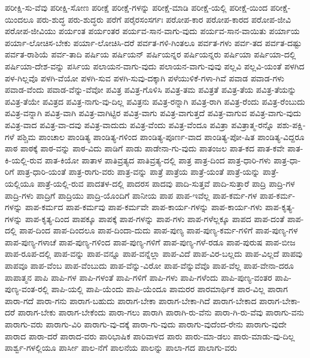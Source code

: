 {ಪರೀಕ್ಷಿ-ಸು-ವೆವು
ಪರೀಕ್ಷಿ-ಸೋಣ
ಪರೀಕ್ಷೆ
ಪರೀಕ್ಷೆ-ಗಳನ್ನು
ಪರೀಕ್ಷೆ-ಮಾಡಿ
ಪರೀಕ್ಷೆ-ಯಲ್ಲಿ
ಪರೀಕ್ಷೆ-ಯಿಂದ
ಪರೀಕ್ಷೆ-ಯಿಂದಲೂ
ಪರು-ಶುದ್ಧ
ಪರು-ಶುದ್ಧರು
ಪರೆಗೆ
ಪರೈರಸಂಸರ್ಗಃ
ಪರೋಪ-ಕಾರ
ಪರೋಪ-ಕಾರದ
ಪರೋಪ-ಜೀವಿ
ಪರೋಪ-ಜೀವಿಯು
ಪರ್ಯಂತ
ಪರ್ಯಂತರ
ಪರ್ಯವ-ಸಾನ-ವಾಗು-ವುದು
ಪರ್ಯವ-ಸಾನ-ವಾಯಿತು
ಪರ್ಯಾಯ
ಪರ್ಯಾ-ಲೋಚಿಸ-ಬೇಕು
ಪರ್ಯಾ-ಲೋಚಿಸಿ-ದರೆ
ಪರ್ವತ-ಗಳಿ-ಗಿಂತಲೂ
ಪರ್ವತ-ಗಳು
ಪರ್ವ-ತದ
ಪರ್ವತ-ದಷ್ಟು
ಪರ್ವತ-ರಾಶಿಯೆ
ಪರ್ವ-ತಾದಿ
ಪರ್ಷಿಯ
ಪರ್ಷಿಯನ್
ಪರ್ಷಿಯನ್ನರ
ಪರ್ಷಿಯನ್ನರು
ಪರ್ಷಿಯಾ
ಪರ್ಷಿಯಾ-ದಲ್ಲಿ
ಪರ್ಷಿಯಾ-ದೇಶ-ವನ್ನು
ಪರ್ಸಿಯ
ಪಲಾಯನ-ವಾಗು-ವುದು
ಪಲಾಯನ-ವಾಗು-ವುವು
ಪಲ್ಲವಿ
ಪಲ್ಲವಿ-ಯಂತೆ
ಪಳಗಿದ
ಪಳ-ಗಿಲ್ಲವೊ
ಪಳಗಿ-ವೆಯೋ
ಪಳಗಿ-ಸುವ
ಪಳಗಿ-ಸುವು-ದಕ್ಕಾಗಿ
ಪಳೆಯುಳಿಕೆ-ಗಳಾ-ಗಿವೆ
ಪವಾಡ
ಪವಾಡ-ಗಳು
ಪವಾಡ-ವೆಂದು
ಪವಾಡ-ವೆನ್ನು-ವೆವೋ
ಪವಿತ್ರ
ಪವಿತ್ರ-ಗೊಳಿಸಿ
ಪವಿತ್ರ-ತಮ
ಪವಿತ್ರತೆ
ಪವಿತ್ರ-ತೆಯ
ಪವಿತ್ರ-ತೆಯನ್ನು
ಪವಿತ್ರ-ತೆಯೇ
ಪವಿತ್ರದ
ಪವಿತ್ರ-ನಾಗು-ವು-ದಿಲ್ಲ
ಪವಿತ್ರನು
ಪವಿತ್ರ-ರನ್ನಾಗಿ
ಪವಿತ್ರ-ರಾಗಿ
ಪವಿತ್ರ-ರೆಂದು
ಪವಿತ್ರ-ರೆಂಬುದು
ಪವಿತ್ರ-ವನ್ನಾಗಿ
ಪವಿತ್ರ-ವಾಗಿ
ಪವಿತ್ರ-ವಾಗಿಟ್ಟಿರ
ಪವಿತ್ರ-ವಾಗು
ಪವಿತ್ರ-ವಾಗುತ್ತದೆ
ಪವಿತ್ರ-ವಾಗುವ
ಪವಿತ್ರ-ವಾಗು-ವುದು
ಪವಿತ್ರ-ವಾದ
ಪವಿತ್ರ-ವಾ-ದವು
ಪವಿತ್ರ-ವಾದುದು
ಪವಿತ್ರ-ವೆಂದು
ಪವಿತ್ರ-ವೆಂದೂ
ಪವಿತ್ರಾ
ಪವಿತ್ರಾತ್ಮ-ರನ್ನೊ
ಪಶು-ಪಕ್ಷಿ-ಗಳೆ
ಪಶ್ಚಿಮ
ಪಾಂಚಾಲ
ಪಾಂಡಿತ್ಯ
ಪಾಂಡಿತ್ಯ-ಗಳಿಂದ
ಪಾಂಡಿತ್ಯ-ಪೂರ್ಣ-ವಾದ
ಪಾಂಡಿತ್ಯ-ಪೋ-ಷಿತ
ಪಾಂಡಿತ್ಯ-ವಿದ್ದರೂ
ಪಾಠ
ಪಾಠಕ್ಕೆ
ಪಾಠ-ವನ್ನು
ಪಾಠ-ವಿದು
ಪಾಡಿಗೆ
ಪಾಡು
ಪಾಡೇನಾ-ಗು-ವುದು
ಪಾತಂಜಲ
ಪಾತ-ಕದ
ಪಾತ-ಕವೇ
ಪಾತ-ಕಿ-ಯಲ್ಲಿ-ರುವ
ಪಾತ-ಕಿಯೋ
ಪಾತಾಳ
ಪಾತಿವ್ರತ್ಯದ
ಪಾತಿವ್ರತ್ಯ-ದಲ್ಲಿ
ಪಾತ್ರ
ಪಾತ್ರ-ದಿಂದ
ಪಾತ್ರ-ಧಾರಿ-ಗಳು
ಪಾತ್ರ-ಧಾ-ರಿಗೆ
ಪಾತ್ರ-ಧಾರಿ-ಯಂತೆ
ಪಾತ್ರ-ರಾಗು-ವರು
ಪಾತ್ರ-ವನ್ನು
ಪಾತ್ರೆ
ಪಾತ್ರೆಯ
ಪಾತ್ರೆ-ಯಂತೆ
ಪಾತ್ರೆ-ಯನ್ನು
ಪಾತ್ರೆ-ಯಲ್ಲಿಯೂ
ಪಾತ್ರೆ-ಯಲ್ಲಿ-ರುವ
ಪಾದತಳ-ದಲ್ಲಿ
ಪಾದರಸ
ಪಾದವು
ಪಾದಿ-ಸುತ್ತವೆ
ಪಾದಿ-ಸುತ್ತಾರೆ
ಪಾದ್ರಿ
ಪಾದ್ರಿ-ಗಳ
ಪಾದ್ರಿ-ಗಳು
ಪಾದ್ರಿಗೆ
ಪಾದ್ರಿಯು
ಪಾದ್ರಿ-ಯೊಂದಿಗೆ
ಪಾನೀಯ
ಪಾಪ
ಪಾಪ-ಇವೆಲ್ಲ
ಪಾಪ-ಕರ್ಮ-ಗಳ
ಪಾಪ-ಕರ್ಮ-ಗಳನ್ನು
ಪಾಪ-ಕರ್ಮದ
ಪಾಪ-ಕರ್ಮವು
ಪಾಪ-ಕರ್ಮವೇ
ಪಾಪ-ಕಾರ್ಯ-ಗಳನ್ನು
ಪಾಪ-ಕಾರ್ಯ-ಗಳು
ಪಾಪ-ಕೃತ್ಯ-ಗಳನ್ನು
ಪಾಪ-ಕೃತ್ಯ-ದಿಂದ
ಪಾಪಕ್ಕೂ
ಪಾಪಕ್ಕೆ
ಪಾಪ-ಗಳನ್ನು
ಪಾಪ-ಗಳು
ಪಾಪ-ಗಳೆಲ್ಲಕ್ಕೂ
ಪಾಪದ
ಪಾಪ-ದಂತೆ
ಪಾಪ-ದಲ್ಲಿ
ಪಾಪ-ದಿಂದ
ಪಾಪ-ದಿಂದಲೂ
ಪಾಪ-ದಿಂದಾ-ದುದು
ಪಾಪ-ಪುಣ್ಯ
ಪಾಪ-ಪುಣ್ಯ-ಕರ್ಮ-ಗಳಿಗೆ
ಪಾಪ-ಪುಣ್ಯ-ಗಳ
ಪಾಪ-ಪುಣ್ಯ-ಗಳಾಚೆ
ಪಾಪ-ಪುಣ್ಯ-ಗಳಿಂದ
ಪಾಪ-ಪುಣ್ಯ-ಗಳಿಗೆ
ಪಾಪ-ಪುಣ್ಯ-ಗಳೆ-ರಡೂ
ಪಾಪ-ಪುರುಷ
ಪಾಪ-ಬೀಜ
ಪಾಪ-ರೂಪ-ದಲ್ಲಿ
ಪಾಪ-ವನ್ನು
ಪಾಪ-ವನ್ನೂ
ಪಾಪ-ವನ್ನೆಲ್ಲಾ
ಪಾಪ-ವಿದೆ
ಪಾಪ-ವಿರ-ಬಲ್ಲದು
ಪಾಪ-ವಿಲ್ಲದೆ
ಪಾಪವು
ಪಾಪವೂ
ಪಾಪ-ವೆಂಬ
ಪಾಪ-ವೆಂಬುದು
ಪಾಪ-ವೆನ್ನು-ವಿರೋ
ಪಾಪ-ವೆನ್ನುವೆವೊ
ಪಾಪ-ವೆಲ್ಲ
ಪಾಪ-ವೇನಾ-ದರೂ
ಪಾಪಾತ್ಮನ
ಪಾಪಿ
ಪಾಪಿ-ಗಳ
ಪಾಪಿ-ಗಳಂತೆ
ಪಾಪಿ-ಗಳಿಗೆ
ಪಾಪಿ-ಗಳು
ಪಾಪಿ-ಗಳೆಂದು
ಪಾಪಿ-ಪುಣ್ಯ-ವಂತರ
ಪಾಪಿ-ಪುಣ್ಯ-ವಂತ-ರಲ್ಲಿ
ಪಾಪಿ-ಯಲ್ಲಿ
ಪಾಪಿ-ಯೆಂದು
ಪಾಪಿ-ಯೆಂದೂ
ಪಾಮರರ
ಪಾರಮಾರ್ಥಿಕ
ಪಾರ-ವಿಲ್ಲ
ಪಾರಾಗ
ಪಾರಾ-ಗದೆ
ಪಾರಾ-ಗನು
ಪಾರಾಗ-ಬಹುದು
ಪಾರಾಗ-ಬೇಕಾ
ಪಾರಾಗ-ಬೇಕಾ-ಗಿದೆ
ಪಾರಾಗ-ಬೇಕಾದ
ಪಾರಾಗ-ಬೇಕಾ-ದರೆ
ಪಾರಾಗ-ಬೇಕು
ಪಾರಾಗ-ಬೇಕೆಂದು
ಪಾರಾ-ಗಲು
ಪಾರಾಗಿ
ಪಾರಾಗಿ-ರು-ವೆನು
ಪಾರಾ-ಗಿ-ರು-ವೆವು
ಪಾರಾಗು-ವನು
ಪಾರಾಗು-ವರು
ಪಾರಾಗು-ವಿರಿ
ಪಾರಾಗು-ವು-ದಕ್ಕೆ
ಪಾರಾ-ಗು-ವುದು
ಪಾರಾಗು-ವುದೆಂದ-ರೇನು
ಪಾರಾಗು-ವುದೇ
ಪಾರಾದ
ಪಾರಾ-ದರೆ
ಪಾರಾದ-ವರು
ಪಾರಿಭಾಷಿಕ
ಪಾರಿವಾಳದ
ಪಾರು
ಪಾರು-ಮಾ-ಡಲು
ಪಾರು-ಮಾಡು-ವು-ದಿಲ್ಲ
ಪಾರ್ಶ್ವ-ಗಳಲ್ಲಿಯೂ
ಪಾರ್ಸೀ
ಪಾಲ-ನೆಗೆ
ಪಾಲನೆಯ
ಪಾಲನ್ನು
ಪಾಲಾ-ಗದ
ಪಾಲಾಗು-ವರು
}
